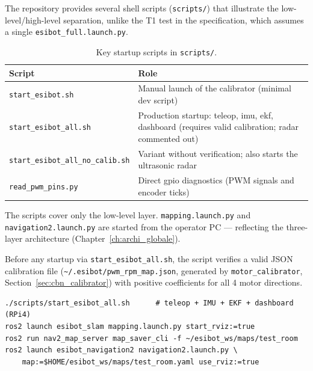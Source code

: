 The repository provides several shell scripts (\texttt{scripts/}) that illustrate the
low-level/high-level separation, unlike the T1 test in the specification, which assumes a
single \texttt{esibot\_full.launch.py}.

\begin{table}[H]
	\centering
	\caption{Key startup scripts in \texttt{scripts/}.}
	\label{tab:startup_scripts}
	\begin{tabularx}{\linewidth}{L{3.8cm} L{7.9cm}}
		\toprule
		\textbf{Script} & \textbf{Role} \\
		\midrule
		\texttt{start\_esibot.sh} & Manual launch of the calibrator (minimal dev script) \\
		\texttt{start\_esibot\_all.sh} & Production startup: teleop, \gls{imu}, \gls{ekf}, dashboard (requires valid calibration; radar commented out) \\
		\texttt{start\_esibot\_all\_no\_\allowbreak calib.sh} & Variant without verification; also starts the ultrasonic radar \\
		\texttt{read\_pwm\_pins.py} & Direct \gls{gpio} diagnostics (PWM signals and encoder ticks) \\
		\bottomrule
	\end{tabularx}
\end{table}

\begin{notebox}[title={Kinect/SLAM pipeline started separately}]
	The scripts cover only the low-level layer. \texttt{mapping.launch.py} and \texttt{navigation2.launch.py} are started from the operator PC --- reflecting the three-layer architecture (Chapter~\ref{ch:archi_globale}).
\end{notebox}

Before any startup via \texttt{start\_esibot\_all.sh}, the script verifies a valid JSON calibration file (\texttt{\textasciitilde/.esibot/pwm\_rpm\_map.json}, generated by \texttt{motor\_calibrator}, Section~\ref{sec:cbn_calibrator}) with positive coefficients for all 4 motor directions.

\begin{lstlisting}[style=BashStyle, caption={Full startup sequence.}, label={lst:slam_nav_sequence}]
./scripts/start_esibot_all.sh      # teleop + IMU + EKF + dashboard (RPi4)
ros2 launch esibot_slam mapping.launch.py start_rviz:=true
ros2 run nav2_map_server map_saver_cli -f ~/esibot_ws/maps/test_room
ros2 launch esibot_navigation2 navigation2.launch.py \
    map:=$HOME/esibot_ws/maps/test_room.yaml use_rviz:=true
\end{lstlisting}
